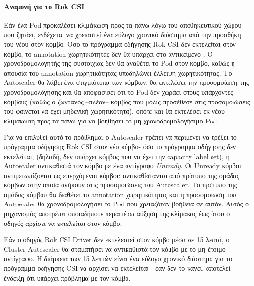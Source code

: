 \paragraph*{Αναμονή για το Rok CSI}

Εάν ένα Pod προκαλέσει κλιμάκωση προς τα πάνω λόγω του αποθηκευτικού χώρου που
ζητάει, ενδέχεται να χρειαστεί ένα εύλογο χρονικό διάστημα από την προσθήκη του
νέου στον κόμβο. Όσο το πρόγραμμα οδήγησης Rok CSI δεν εκτελείται στον κόμβο, το
annotation χωρητικότητας δεν θα υπάρχει στο αντικείμενο . Ο
χρονοδρομολογητής της συστοιχίας δεν θα αναθέτει το Pod στον κόμβο, καθώς η
απουσία του annotation χωρητικότητας υποδηλώνει έλλειψη χωρητικότητας.  Το Autoscaler θα
λάβει ένα στιγμιότυπο των κόμβων, θα εκτελέσει την προσομοίωση της
χρονοδρομολόγησης και θα αποφασίσει ότι το Pod δεν χωράει στους υπάρχοντες
κόμβους (καθώς ο ζωντανός --πλέον-- κόμβος που μόλις προσέθεσε στις
προσομοιώσεις του φαίνεται να έχει μηδενική χωρητικότητα), οπότε και θα
εκτελέσει εκ νέου κλιμάκωση προς τα πάνω για να βοηθήσει το μη
χρονοδρομολογήσιμο Pod.

Για να επιλυθεί αυτό το πρόβλημα, ο Autoscaler πρέπει να περιμένει να τρέξει το
πρόγραμμα οδήγησης Rok CSI στον νέο κόμβο- όσο το πρόγραμμα οδήγησης δεν
εκτελείται, (δηλαδή, δεν υπάρχει κόμβος που να έχει την capacity label set), η
Autoscaler αντικαθιστά τον κόμβο με ένα αντίγραφο \textit{Unready}. Οι Unready κόμβοι
αντιμετωπίζονται ως επερχόμενοι κόμβοι: αντικαθίστανται από πρότυπο της ομάδας
κόμβων στην οποία ανήκουν στις προσομοιώσεις του Autoscaler. Το πρότυπο της ομάδας
κόμβου θα διαθέτει το annotation χωρητικότητας και η προσομοίωση του Autoscaler θα
χρονοδρομολογήσει το Pod που χρειαζόταν βοήθεια σε αυτόν. Αυτός ο μηχανισμός
αποτρέπει οποιαδήποτε περαιτέρω αύξηση της κλίμακας έως ότου ο οδηγός αρχίσει να
εκτελείται στον κόμβο.

Εάν ο οδηγός Rok CSI Driver δεν εκτελεστεί στον κόμβο μέσα σε 15 λεπτά, ο
Cluster Autoscaler θα σταματήσει να αντικαθιστά τον κόμβο με το μη έτοιμο
αντίγραφο. Η διάρκεια των 15 λεπτών είναι ένα εύλογο χρονικό διάστημα για το
πρόγραμμα οδήγησης CSI να αρχίσει να εκτελείται - εάν δεν το κάνει, αποτελεί
ένδειξη ότι υπάρχει πρόβλημα με τον κόμβο.
